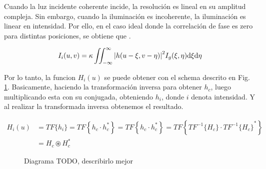 \documentclass{./packages/optica-article}
\newcommand\conv{\circledast}
\begin{document}
Cuando la luz incidente coherente incide, la resolución es lineal en su amplitud compleja. Sin embargo, cuando la iluminación es incoherente, la iluminación es linear en intensidad. Por ello, en el caso ideal donde la correlación de fase es zero para distintas posiciones, se obtiene que \cite[p.~132--134]{goodman1996introduction}.

\begin{equation}
	I_{i}(u,v) = \kappa \iint_{-\infty}^{\infty}\abs{h(u - \xi, v- \eta)}^{2} I_{g}(\xi, \eta) \dd \xi \dd \eta
\end{equation}

Por lo tanto, la funcion $H_{i}(u)$ se puede obtener con el schema descrito en Fig. \ref{fig:transformacion}. Basicamente, haciendo la transformación inversa para obtener $h_{c}$, luego multiplicando esta con su conjugada, obteniendo $h_{i}$, donde $i$ denota intensidad. Y al realizar la transformada inversa obtenemos el resultado.

\begin{align}
H_{i}(u) 
	&= TF\{h_i\} 
	= TF\left\{ h_{c} \cdot h^{*}_{c}\right\}
	= TF\left\{ h_{c} \cdot h^{*}_{c}\right\} 
	= TF\left\{ TF^{-1}\{H_{c}\} \cdot {TF^{-1}\{H_{c}\}}^{*}\right\} 
	\\
 &= H_{c} \conv H^{*}_{c}
\end{align}

\begin{figure}[htpb]
\begin{center}
\end{center}
\caption{Diagrama TODO, describirlo mejor}
\label{fig:transformacion}
\end{figure}
\end{document}
